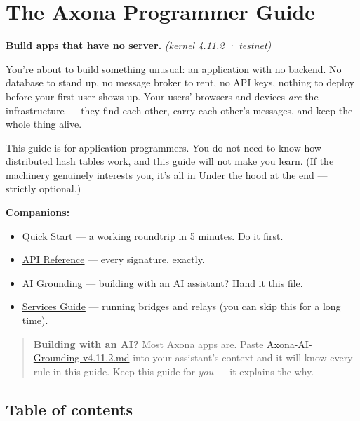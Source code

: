 \documentclass[
  nobib]{tufte-handout}
\author{}
\date{}
\providecommand{\tightlist}{%
  \setlength{\itemsep}{0pt}\setlength{\parskip}{0pt}}
\begin{document}
\section{The Axona Programmer Guide}\label{the-axona-programmer-guide}

\textbf{Build apps that have no server.} \emph{(kernel 4.11.2 ·
testnet)}

You're about to build something unusual: an application with no backend.
No database to stand up, no message broker to rent, no API keys, nothing
to deploy before your first user shows up. Your users' browsers and
devices \emph{are} the infrastructure --- they find each other, carry
each other's messages, and keep the whole thing alive.

This guide is for application programmers. You do not need to know how
distributed hash tables work, and this guide will not make you learn.
(If the machinery genuinely interests you, it's all in
\hyperref[9-under-the-hood--optional]{Under the hood} at the end ---
strictly optional.)

\textbf{Companions:}

\begin{itemize}
\tightlist
\item
  \href{Quick-Start-v4.11.2.md}{Quick Start} --- a working roundtrip in
  5 minutes. Do it first.
\item
  \href{Axona-API-Reference-v4.11.2.md}{API Reference} --- every
  signature, exactly.
\item
  \href{Axona-AI-Grounding-v4.11.2.md}{AI Grounding} --- building with
  an AI assistant? Hand it this file.
\item
  \href{Axona-Services-Guide-v4.11.2.md}{Services Guide} --- running
  bridges and relays (you can skip this for a long time).
\end{itemize}

\begin{quote}
\textbf{Building with an AI?} Most Axona apps are. Paste
\url{Axona-AI-Grounding-v4.11.2.md} into your assistant's context and it
will know every rule in this guide. Keep this guide for \emph{you} ---
it explains the why.
\end{quote}

\subsection{Table of contents}\label{table-of-contents}
\end{document}
